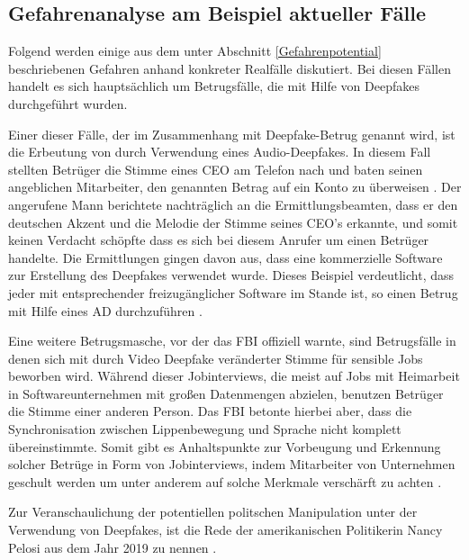 \subsection{Gefahrenanalyse am Beispiel aktueller Fälle}\label{GefahrenAktuelleFaelle}
Folgend werden einige aus dem unter Abschnitt \ref{Gefahrenpotential} beschriebenen Gefahren anhand konkreter Realfälle diskutiert. 
Bei diesen Fällen handelt es sich hauptsächlich um Betrugsfälle, die mit Hilfe von Deepfakes durchgeführt wurden.
\par
Einer dieser Fälle, der im Zusammenhang mit Deepfake-Betrug genannt wird, ist die Erbeutung von  durch Verwendung eines Audio-Deepfakes.
In diesem Fall stellten Betrüger die Stimme eines CEO am Telefon nach und baten seinen angeblichen Mitarbeiter, den genannten Betrag auf ein Konto zu überweisen \citep[][]{Stupp2019}. 
Der angerufene Mann berichtete nachträglich an die Ermittlungsbeamten, dass er den deutschen Akzent und die Melodie der Stimme seines CEO's erkannte, und somit keinen Verdacht schöpfte dass es sich bei diesem Anrufer um einen Betrüger handelte.
Die Ermittlungen gingen davon aus, dass eine kommerzielle Software zur Erstellung des Deepfakes verwendet wurde.
Dieses Beispiel verdeutlicht, dass jeder mit entsprechender freizugänglicher Software im Stande ist, so einen Betrug mit Hilfe eines AD durchzuführen \citep[Vgl.][]{Stupp2019}. 
\par
Eine weitere Betrugsmasche, vor der das FBI offiziell warnte, sind Betrugsfälle in denen sich mit durch Video Deepfake veränderter Stimme für sensible Jobs beworben wird.
Während dieser Jobinterviews, die meist auf Jobs mit Heimarbeit in Softwareunternehmen mit großen Datenmengen abzielen, benutzen Betrüger die Stimme einer anderen Person.
Das FBI betonte hierbei aber, dass die Synchronisation zwischen Lippenbewegung und Sprache nicht komplett übereinstimmte.
Somit gibt es Anhaltspunkte zur Vorbeugung und Erkennung solcher Betrüge in Form von Jobinterviews, indem Mitarbeiter von Unternehmen geschult werden um unter anderem auf solche Merkmale verschärft zu achten \citep[][]{Ferraro2022}. 
\par
Zur Veranschaulichung der potentiellen politschen Manipulation unter der Verwendung von Deepfakes, ist die Rede der amerikanischen Politikerin Nancy Pelosi aus dem Jahr 2019 zu nennen \citep[Vgl.][]{Mervosh2019}.
